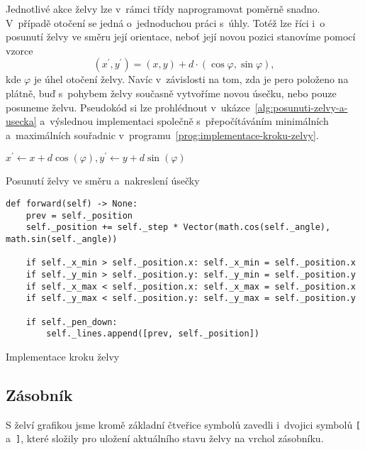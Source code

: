 Jednotlivé akce želvy lze v~rámci třídy naprogramovat poměrně snadno. V~případě otočení se jedná o~jednoduchou práci s~úhly. Totéž lze říci i~o posunutí želvy ve směru její orientace, neboť její novou pozici stanovíme pomocí vzorce
\[(x^\prime,y^\prime)=(x,y)+d\cdot(\cos\varphi,\sin\varphi),\]
kde $\varphi$ je úhel otočení želvy. Navíc v~závislosti na tom, zda je pero položeno na plátně, buď s~pohybem želvy současně vytvoříme novou úsečku, nebo pouze posuneme želvu. Pseudokód si lze prohlédnout v~ukázce~\ref{alg:posunuti-zelvy-a-usecka} a~výslednou implementaci společně s~přepočítáváním minimálních a~maximálních souřadnic v~programu~\ref{prog:implementace-kroku-zelvy}.
\begin{algorithm}[h]
    $x^\prime\gets x+d\cos(\varphi),y^\prime\gets y+d\sin(\varphi)$\;
    \;
    \caption{Posunutí želvy ve směru a~nakreslení úsečky}
    \label{alg:posunuti-zelvy-a-usecka}
\end{algorithm}
\begin{program}[h]
\begin{lstlisting}[style=python]
def forward(self) -> None:
    prev = self._position
    self._position += self._step * Vector(math.cos(self._angle), math.sin(self._angle))

    if self._x_min > self._position.x: self._x_min = self._position.x
    if self._y_min > self._position.y: self._y_min = self._position.y
    if self._x_max < self._position.x: self._x_max = self._position.x
    if self._y_max < self._position.y: self._y_max = self._position.y

    if self._pen_down:
        self._lines.append([prev, self._position])
\end{lstlisting}
    \caption{Implementace kroku želvy}
    \label{prog:implementace-kroku-zelvy}
\end{program}

\subsection{Zásobník}\label{subsec:zasobnik}

S želví grafikou jsme kromě základní čtveřice symbolů zavedli i~dvojici symbolů \texttt{[} a~\texttt{]}, které složily pro uložení aktuálního stavu želvy na vrchol zásobníku.

